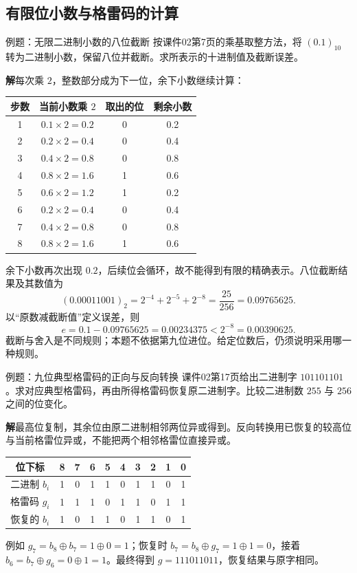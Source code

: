 \documentclass[UTF8,fontset=none,zihao=-4,a4paper]{ctexart}
\newcommand{\sol}{\par\noindent\textbf{解}\quad}
\begin{document}
\subsection{有限位小数与格雷码的计算}
\begin{infobox}{例题：无限二进制小数的八位截断}
按课件02第7页的乘基取整方法，将 $(0.1)_{10}$ 转为二进制小数，保留八位并截断。求所表示的十进制值及截断误差。
\end{infobox}
\sol 每次乘 $2$，整数部分成为下一位，余下小数继续计算：
\begin{center}
\begin{tabular}{c c c c}
\toprule 步数 & 当前小数乘 $2$ & 取出的位 & 剩余小数\\\midrule
1&$0.1\times2=0.2$&0&0.2\\
2&$0.2\times2=0.4$&0&0.4\\
3&$0.4\times2=0.8$&0&0.8\\
4&$0.8\times2=1.6$&1&0.6\\
5&$0.6\times2=1.2$&1&0.2\\
6&$0.2\times2=0.4$&0&0.4\\
7&$0.4\times2=0.8$&0&0.8\\
8&$0.8\times2=1.6$&1&0.6\\\bottomrule
\end{tabular}
\end{center}
余下小数再次出现 $0.2$，后续位会循环，故不能得到有限的精确表示。八位截断结果及其数值为
\[
(0.00011001)_2=2^{-4}+2^{-5}+2^{-8}
=\frac{25}{256}=0.09765625.
\]
以“原数减截断值”定义误差，则
\[
e=0.1-0.09765625=0.00234375<2^{-8}=0.00390625.
\]
截断与舍入是不同规则；本题不依据第九位进位。给定位数后，仍须说明采用哪一种规则。

\begin{infobox}{例题：九位典型格雷码的正向与反向转换}
课件02第17页给出二进制字 $101101101$。求对应典型格雷码，再由所得格雷码恢复原二进制字。比较二进制数 $255$ 与 $256$ 之间的位变化。
\end{infobox}
\sol 最高位复制，其余位由原二进制相邻两位异或得到。反向转换用已恢复的较高位与当前格雷位异或，不能把两个相邻格雷位直接异或。
\begin{center}
\begin{tabular}{c *{9}{c}}
\toprule 位下标 &8&7&6&5&4&3&2&1&0\\\midrule
二进制 $b_i$&1&0&1&1&0&1&1&0&1\\
格雷码 $g_i$&1&1&1&0&1&1&0&1&1\\
恢复的 $b_i$&1&0&1&1&0&1&1&0&1\\\bottomrule
\end{tabular}
\end{center}
例如 $g_7=b_8\oplus b_7=1\oplus0=1$；恢复时 $b_7=b_8\oplus g_7=1\oplus1=0$，接着 $b_6=b_7\oplus g_6=0\oplus1=1$。最终得到 $g=111011011$，恢复结果与原字相同。
\end{document}
